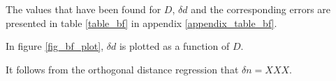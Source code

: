 
The values that have been found for $D$, $\delta d$ and the corresponding errors are presented in table \ref{table_bf} in appendix \ref{appendix_table_bf}.

In figure \ref{fig_bf_plot}, $\delta d$ is plotted as a function of $D$. 


It follows from the orthogonal distance regression that $\delta n = XXX$. 
















\begin{comment}
In theResultaten en discussie (Results and discussion) chapter, you present your results, generally in the form of graphs, and you discuss them. A single small table (m aximum ~10 rows x ~5 columns) is acceptable, but large tables should be in an appendix. In deviation from what many students believe, it is not desirable to separate the presentation and the discussion of results from each other. In professional literature, this is most often done together.\\ •You should introduce each graph:\\ -Why has this graph been included in the report. (What do we want to learn from this graph?).\\-Why   have   you   plotted   this   Y-axis   variable   as   a   function   of   this   X-axis   variable   (which   theoretical/expected relationship is tested/demonstrated in this this graph? \\•Then you tell the reader what (according to you) he/she should see in the graph, limiting yourself toconclusions  that  are  relatively  indisputable.  The  more  speculative  conclusions  should  be  in the  next  chapter.
\end{comment}
